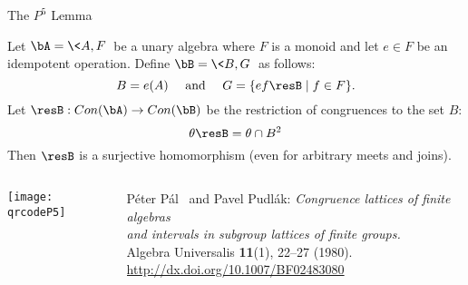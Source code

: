 \begin{frame}[fragile,label=P5Lemma]{The $P^5$ Lemma}
\begin{lemma}
 Let  $\bA = \<A, F\>$ be  a  unary  algebra  where  $F$  is  a  monoid  and  let 
$e \in F$  be  an  idempotent  operation.  Define  $\bB = \<B, G\>$ as follows:
\[
B=e(A) \quad \text{ and } \quad  
G = \{ef\resB \mid f\in F\}.
\]
Let $\resB :  Con (\bA)\rightarrow Con (\bB)$  be the restriction  of 
congruences  to  the set $B$:
\[
\theta \resB = \theta \cap B^2
\]
Then  $\resB$  is  a  surjective  homomorphism  
(even  for  arbitrary meets  and  joins). 
\end{lemma}
\vskip1cm
  \begin{columns}
    \begin{column}{0.2\textwidth}
      \begin{flushright}
        \texttt{[image: qrcodeP5]}
      \end{flushright}
    \end{column}
      \begin{column}{0.9\textwidth}
{\small P{\'e}ter P{\'a}l \Palfy\ and Pavel Pudl{\'a}k: {\it Congruence lattices of finite algebras\\ and
  intervals in subgroup lattices of finite groups.}\\[4pt]
 Algebra Universalis \textbf{11}(1), 22--27 (1980).\\
\urlprefix \url{http://dx.doi.org/10.1007/BF02483080}}
      \end{column}
    \end{columns}


\end{frame}


